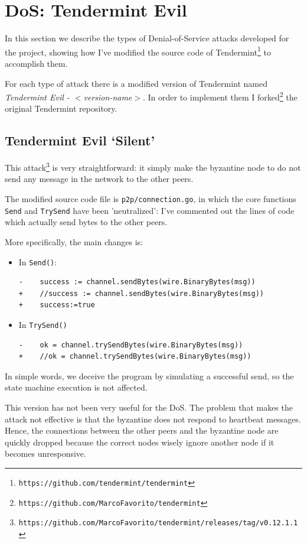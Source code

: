 \documentclass[]{article}
\begin{document}
\section{DoS: Tendermint Evil}
\label{tevil}
In this section we describe the types of Denial-of-Service attacks developed for the project, showing how I've modified the source code of Tendermint\footnote{\texttt{https://github.com/tendermint/tendermint}} to accomplish them.

For each type of attack there is a modified version of Tendermint named \textit{Tendermint Evil - $<$version-name$>$}. In order to implement them I forked\footnote{\texttt{https://github.com/MarcoFavorito/tendermint}} the original Tendermint repository.

\subsection{Tendermint Evil `Silent'}
This attack\footnote{\texttt{https://github.com/MarcoFavorito/tendermint/releases/tag/v0.12.1.1}} is very straightforward: it simply make the byzantine node to do not send any message in the network to the other peers.

The modified source code file is \texttt{p2p/connection.go}, in which the core functions \texttt{Send} and \texttt{TrySend} have been 'neutralized': I've commented out the lines of code which actually send bytes to the other peers.

More specifically, the main changes is:
\begin{itemize}
\item In \texttt{Send()}:
\begin{verbatim}
-    success := channel.sendBytes(wire.BinaryBytes(msg))
+    //success := channel.sendBytes(wire.BinaryBytes(msg))
+    success:=true
\end{verbatim}
\item In \texttt{TrySend()}
\begin{verbatim}
-    ok = channel.trySendBytes(wire.BinaryBytes(msg))
+    //ok = channel.trySendBytes(wire.BinaryBytes(msg))
\end{verbatim}
\end{itemize}

In simple words, we deceive the program by simulating a successful send, so the state machine execution is not affected.

This version has not been very useful for the DoS. The problem that makes the attack not effective is that the byzantine does not respond to heartbeat messages. Hence, the connections between the other peers and the byzantine node are quickly dropped because the correct nodes wisely ignore another node if it becomes unresponsive.
\end{document}
